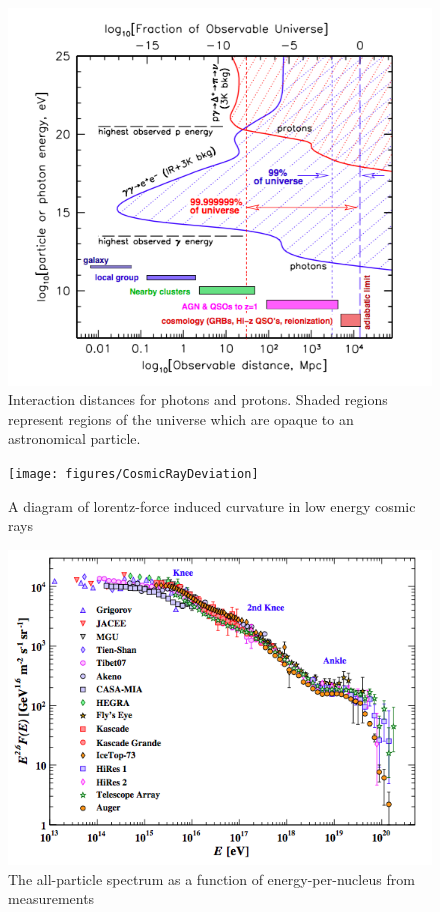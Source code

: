 \noindent		
\begin{figure}
\label{fig:observableUniverse}
	\includegraphics[width=\textwidth]{figures/ObservableUniverse}
	\caption{Interaction distances for photons and protons.  Shaded regions represent regions of the universe which are opaque to an astronomical particle.}
\end{figure}		
	

\noindent		
\begin{figure}
\label{fig:cosmicrayDeviation}
	\texttt{[image: figures/CosmicRayDeviation]}
	\caption{A diagram of lorentz-force induced curvature in low energy cosmic rays}
\end{figure}		
		

\noindent		
\begin{figure}
\label{fig:cosmicrayflux}
	\includegraphics[width=\textwidth]{figures/CosmicRayFluxMeasurements}
	\caption{The all-particle spectrum as a function of energy-per-nucleus from measurements\cite{Olive:2016xmw}}
\end{figure}		
		
